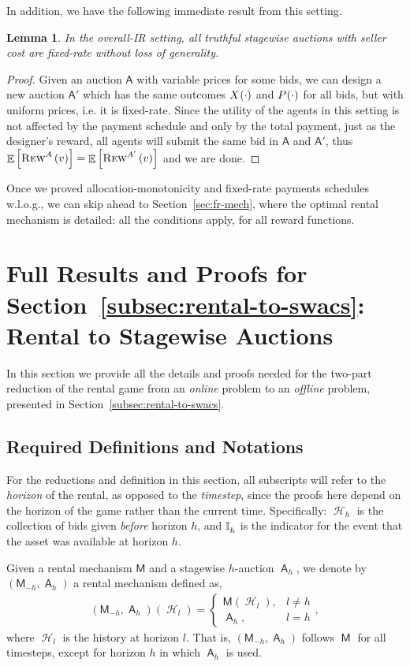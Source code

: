 \documentclass[11pt,letterpaper]{article}
\newcommand{\sqbr}[1]{\left[ #1 \right]}
\newcommand{\brackets}[1]{\left( #1 \right)}
\newcommand{\oir}{overall-IR\xspace}
\newcommand{\fr}{fixed-rate\xspace}
\DeclareMathOperator*{\E}{\bb{E}}
\DeclareMathOperator{\history}{\mathcal{H}}
\newcommand{\bb}[1]{\mathbb{#1}}
\DeclareMathOperator{\A}{\auc{A}}
\DeclareMathOperator{\M}{\mech{M}}
\theoremstyle{plain}
\newtheorem{lemma}[theorem]{Lemma}
\newcommand{\auc}[1]{\mathsf{#1}}
\newcommand{\mech}[1]{\mathsf{#1}}
\begin{document}
In addition, we have the following immediate result from this setting.
\begin{lemma}\label{lemma:overall-ir-oneshot}
    In the \oir setting, all truthful stagewise auctions with seller cost are \fr without loss of generality.
\end{lemma}
\begin{proof}
    Given an auction $\auc{A}$ with variable prices for some bids, we can design a new auction $\auc{A'}$ which has the same outcomes $\x{\cdot}$ and $\p{\cdot}$ for all bids, but with uniform prices, i.e. it is \fr. Since the utility of the agents in this setting is not affected by the payment schedule and only by the total payment, just as the designer's reward, all agents will submit the same bid in $\auc{A}$ and $\auc{A'}$, thus $\E\sqbr{\trew[A]{v}}=\E\sqbr{\trew[A']{v}}$ and we are done.
\end{proof}


Once we proved allocation-monotonicity and \fr payments schedules w.l.o.g., we can skip ahead to Section~\ref{sec:fr-mech}, where the optimal rental mechanism is detailed: all the conditions apply, for all reward functions.%

\section{Full Results and Proofs for Section~\ref{subsec:rental-to-swacs}: Rental to Stagewise Auctions}\label{app:rental-to-swacs}
In this section we provide all the details and proofs needed for the two-part reduction of the rental game from an \emph{online} problem to an \emph{offline} problem, presented in Section~\ref{subsec:rental-to-swacs}. 

\subsection{Required Definitions and Notations}
For the reductions and definition in this section, all subscripts will refer to the \emph{horizon} of the rental, as opposed to the \emph{timestep}, since the proofs here depend on the horizon of the game rather than the current time. Specifically: $\history_h$ is the collection of bids given \emph{before} horizon $h$, and $\ind{h}$ is the indicator for the event that the asset was available at horizon $h$.

Given a rental mechanism $\mech{M}$ and a stagewise $h$-auction $\A_h$, we denote by $\brackets{\mech{M}_{-h},\A_h}$  a rental mechanism defined as,
\begin{align*}
    \brackets{\mech{M}_{-h},\A_h}(\history_l)=\begin{cases}
        \mech{M}(\history_l),& l\neq h\\
        \A_h,& l=h
    \end{cases},
\end{align*}
where $\history_l$ is the history at horizon $l$. That is, $\brackets{\mech{M}_{-h},\A_h}$ follows $\M$ for all timesteps, except for horizon $h$ in which $\A_h$ is used.
\end{document}
